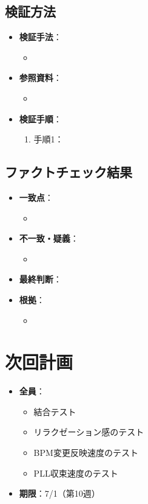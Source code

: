 \documentclass[a4paper,12pt]{ltjsarticle}
\begin{document}
\subsection{検証方法}

\begin{itemize}
  \item \textbf{検証手法}：
    \begin{itemize}
      \item 
    \end{itemize}
  \item \textbf{参照資料}：
    \begin{itemize}
      \item 
    \end{itemize}
  \item \textbf{検証手順}：
    \begin{enumerate}
      \item 手順1：
    \end{enumerate}
\end{itemize}

\subsection{ファクトチェック結果}
\begin{itemize}
  \item \textbf{一致点}：
    \begin{itemize}
      \item 
    \end{itemize}
  \item \textbf{不一致・疑義}：
    \begin{itemize}
      \item 
    \end{itemize}
  \item \textbf{最終判断}：
  \item \textbf{根拠}：
    \begin{itemize}
      \item 
    \end{itemize}
\end{itemize}

\section{次回計画}

\begin{itemize}
  \item \textbf{全員}：
    \begin{itemize}
      \item 結合テスト
      \item リラクゼーション感のテスト
      \item BPM変更反映速度のテスト
      \item PLL収束速度のテスト
    \end{itemize}
  \item \textbf{期限}：7/1（第10週）
\end{itemize}
\end{document}
